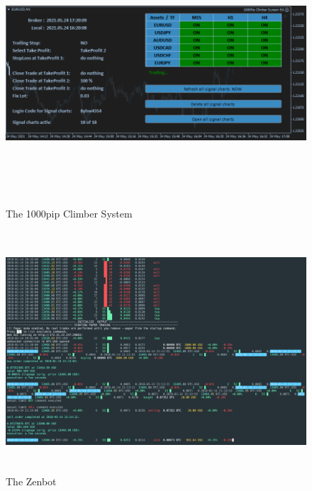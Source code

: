 \documentclass[12pt,a4paper]{report}
\begin{document}
\newpage
\begin{figure}[!htbp]
	\centering
	\includegraphics[width=16cm,height=9cm]{pics/1000PipClimberSystemEA.png}
	\caption{The 1000pip Climber System}
	\label{fig:pip}
	\bigskip
	\includegraphics[width=16cm,height=9cm]{pics/zenbot.png}
	\caption{The Zenbot}
	\label{fig:zenbot}
\end{figure}

\newpage
\end{document}
